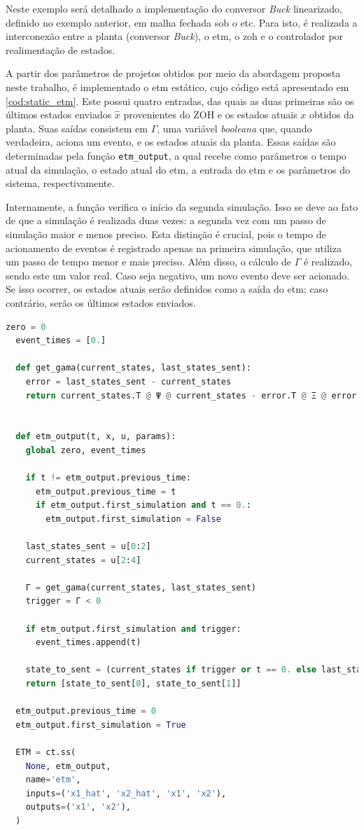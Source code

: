 Neste exemplo será detalhado a implementação do conversor \textit{Buck} linearizado, definido no exemplo anterior, em malha fechada sob o \acrshort{etc}. Para isto, é realizada a interconexão entre a planta (conversor \textit{Buck}), o \acrshort{etm}, o \acrshort{zoh} e o controlador por realimentação de estados.

A partir dos parâmetros de projetos obtidos por meio da abordagem proposta neste trabalho, é implementado o \acrshort{etm} estático, cujo código está apresentado em \ref{cod:static_etm}. Este possui quatro entradas, das quais as duas primeiras são os últimos estados enviados $\hat{x}$ provenientes do ZOH e os estados atuais $x$ obtidos da planta. Suas saídas consistem em $\Gamma$, uma variável \textit{booleana} que, quando verdadeira, aciona um evento, e os estados atuais da planta. Essas saídas são determinadas pela função \texttt{etm\_output}, a qual recebe como parâmetros o tempo atual da simulação, o estado atual do \acrshort{etm}, a entrada do \acrshort{etm} e os parâmetros do sistema, respectivamente.

Internamente, a função verifica o início da segunda simulação. Isso se deve ao fato de que a simulação é realizada duas vezes: a segunda vez com um passo de simulação maior e menos preciso. Esta distinção é crucial, pois o tempo de acionamento de eventos é registrado apenas na primeira simulação, que utiliza um passo de tempo menor e mais preciso. Além disso, o cálculo de $\Gamma$ é realizado, sendo este um valor real. Caso seja negativo, um novo evento deve ser acionado. Se isso ocorrer, os estados atuais serão definidos como a saída do \acrshort{etm}; caso contrário, serão os últimos estados enviados.

\vspace{8pt}
\begin{lstlisting}[language=Python, caption={Implementação do \acrshort{etm} estático.}, label=cod:static_etm]
  zero = 0
  event_times = [0.]

  def get_gama(current_states, last_states_sent):
    error = last_states_sent - current_states
    return current_states.T @ Ψ @ current_states - error.T @ Ξ @ error


  def etm_output(t, x, u, params):
    global zero, event_times

    if t != etm_output.previous_time:
      etm_output.previous_time = t
      if etm_output.first_simulation and t == 0.:
        etm_output.first_simulation = False

    last_states_sent = u[0:2]
    current_states = u[2:4]

    Γ = get_gama(current_states, last_states_sent)
    trigger = Γ < 0

    if etm_output.first_simulation and trigger:
      event_times.append(t)

    state_to_sent = (current_states if trigger or t == 0. else last_states_sent)
    return [state_to_sent[0], state_to_sent[1]]

  etm_output.previous_time = 0
  etm_output.first_simulation = True

  ETM = ct.ss(
    None, etm_output,
    name='etm',
    inputs=('x1_hat', 'x2_hat', 'x1', 'x2'),
    outputs=('x1', 'x2'),
  )
\end{lstlisting}

